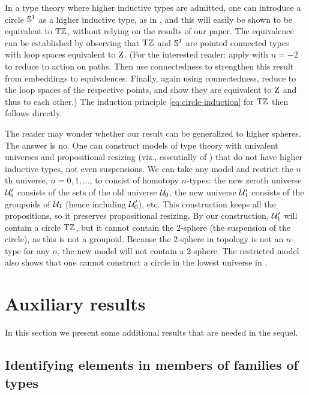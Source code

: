 \documentclass[a4paper,12pt]{amsart}
\begin{document}
In a type theory where higher inductive types are admitted,
one can introduce a circle ${\mathbb{S}^1}$ as a higher inductive type,
as in \cite[6.1]{hottbook},
and this will easily be shown to be equivalent to ${\mathrm{T}\mathbb{Z}}$,
without relying on the results of our paper.
The equivalence can be established by observing that ${\mathrm{T}\mathbb{Z}}$ and ${\mathbb{S}^1}$
are pointed connected types with loop spaces equivalent to $\mathrm{Z}$.
(For the interested reader: apply \cite[Lemma 7.6.2]{hottbook} with $n=-2$
to reduce to action on paths. Then use connectedness to strengthen
this result from embeddings to equivalences.
Finally, again using connectedness, reduce to the loop spaces
of the respective points, and show they are equivalent to $\mathrm{Z}$ and thus to each other.)
The induction principle \cref{eq:circle-induction} for ${\mathrm{T}\mathbb{Z}}$ then follows directly.

The reader may wonder whether our result can be generalized to higher spheres.
The answer is no.
One can construct models of type theory with univalent universes and propositional resizing
(viz., essentially of \UniMath{})
that do not have higher inductive types, not even suspensions.
We can take any model and restrict the $n$th universe, $n=0,1,\dots$,
to consist of homotopy $n$-types:
the new zeroth universe $\mathcal{U}'_0$ consists of the sets of the old universe $\mathcal{U}_0$,
the new universe $\mathcal{U}'_1$ consists of the groupoids of $\mathcal{U}_1$ (hence including $\mathcal{U}'_0$),
etc.
This construction keeps all the propositions, so it preserves propositional resizing.
By our construction, $\mathcal{U}'_1$ will contain a circle ${\mathrm{T}\mathbb{Z}}$,
but it cannot contain the $2$-sphere (the suspension of the circle),
as this is not a groupoid.
Because the $2$-sphere in topology is not an $n$-type for any $n$,
the new model will not contain a $2$-sphere.
The restricted model also shows that one cannot construct a circle in
the lowest universe in \UniMath{}.

\section{Auxiliary results}\label{sec:auxiliaries}

In this section we present some additional results that are needed in the sequel.

\subsection{Identifying elements in members of families of types}
\label{sec:pathovers}
\end{document}
